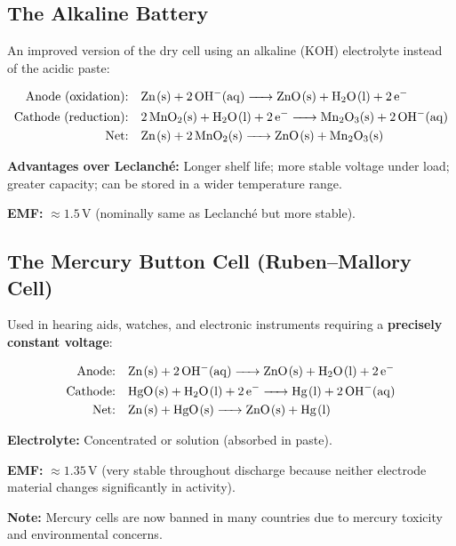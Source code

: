 \subsection{The Alkaline Battery}

An improved version of the dry cell using an alkaline (KOH) electrolyte instead of the acidic  paste:

\begin{align*}
\text{Anode (oxidation):}& \quad \ce{Zn(s) + 2OH-(aq) -> ZnO(s) + H2O(l) + 2e-}\\
\text{Cathode (reduction):}& \quad \ce{2MnO2(s) + H2O(l) + 2e- -> Mn2O3(s) + 2OH-(aq)}\\
\text{Net:}& \quad \ce{Zn(s) + 2MnO2(s) -> ZnO(s) + Mn2O3(s)}
\end{align*}

\textbf{Advantages over Leclanch\'{e}:} Longer shelf life; more stable voltage under load; greater capacity; can be stored in a wider temperature range.

\textbf{EMF:} $\approx 1.5\,\text{V}$ (nominally same as Leclanch\'{e} but more stable).

\subsection{The Mercury Button Cell (Ruben--Mallory Cell)}

Used in hearing aids, watches, and electronic instruments requiring a \textbf{precisely constant voltage}:

\begin{align*}
\text{Anode:}& \quad \ce{Zn(s) + 2OH-(aq) -> ZnO(s) + H2O(l) + 2e-}\\
\text{Cathode:}& \quad \ce{HgO(s) + H2O(l) + 2e- -> Hg(l) + 2OH-(aq)}\\
\text{Net:}& \quad \ce{Zn(s) + HgO(s) -> ZnO(s) + Hg(l)}
\end{align*}

\textbf{Electrolyte:} Concentrated  or  solution (absorbed in paste).

\textbf{EMF:} $\approx 1.35\,\text{V}$ (very stable throughout discharge because neither electrode material changes significantly in activity).

\textbf{Note:} Mercury cells are now banned in many countries due to mercury toxicity and environmental concerns.

